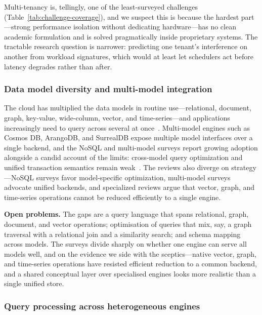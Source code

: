 \documentclass[a4paper,fleqn]{cas-sc}
\begin{document}
Multi-tenancy is, tellingly, one of the least-surveyed challenges (Table~\ref{tab:challenge-coverage}), and we suspect this is because the hardest part---strong performance isolation without dedicating hardware---has no clean academic formulation and is solved pragmatically inside proprietary systems. The tractable research question is narrower: predicting one tenant's interference on another from workload signatures, which would at least let schedulers act before latency degrades rather than after.

\subsubsection{Data model diversity and multi-model integration}
\label{subsubsec:multimodel}

The cloud has multiplied the data models in routine use---relational, document, graph, key-value, wide-column, vector, and time-series---and applications increasingly need to query across several at once~\cite{Lu2019MultiModel,Jain2016HighVariety,Baralis2017Geospatial,Mahmood2019NoSQLLog}. Multi-model engines such as Cosmos DB, ArangoDB, and SurrealDB expose multiple model interfaces over a single backend, and the NoSQL and multi-model surveys report growing adoption alongside a candid account of the limits: cross-model query optimization and unified transaction semantics remain weak~\cite{Davoudian2018NoSQL,Tu2024CassandraMongo,Hendricks2019NoSQLReview,Tripathi2025NoSQLEdu,Lu2019MultiModel}. The reviews also diverge on strategy---NoSQL surveys favor model-specific optimization, multi-model surveys advocate unified backends, and specialized reviews argue that vector, graph, and time-series operations cannot be reduced efficiently to a single engine.

\textbf{Open problems.} The gaps are a query language that spans relational, graph, document, and vector operations; optimisation of queries that mix, say, a graph traversal with a relational join and a similarity search; and schema mapping across models. The surveys divide sharply on whether one engine can serve all models well, and on the evidence we side with the sceptics---native vector, graph, and time-series operations have resisted efficient reduction to a common backend, and a shared conceptual layer over specialised engines looks more realistic than a single unified store.

\subsubsection{Query processing across heterogeneous engines}
\label{subsubsec:queryprocessing}
\end{document}
